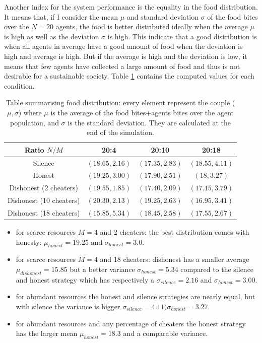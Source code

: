 Another index for the system performance is the equality in the food distribution. 
It means that, if I consider the mean $\mu$ and standard deviation $\sigma$ of 
the food bites over the $N=20$ agents, the food is better distributed ideally when 
the average $\mu$ is high as well as the deviation $\sigma$ is high. 
This indicate that a good distribution is when all agents in average have a good amount of food when the deviation
is high and average is high.
But if the average is high and the deviation is low, it means that few agents have
collected a large amount of food and thus is not desirable for a sustainable society.
Table \ref{tab:foodDistribution} contains the computed values for each condition.

\begin{table}[htbp]
\caption[Social System food distribution]{Table summarising food distribution:
every element represent the couple ($\mu,\sigma$) where $\mu$ is the average of
the food bites+agents bites over the agent population, and $\sigma$ is
the standard deviation. They are calculated at the end of the simulation.
}
\label{tab:foodDistribution}
\begin{center}
\small{
\begin{tabular}{@{}c|ccc@{}}
\hline
Ratio $N/M$ & 20:4 & 20:10 & 20:18\\
\hline
Silence & $(18.65,2.16)$ & $(17.35,2.83)$ & $(18.55,4.11)$\\
\hline
Honest & $(19.25,3.00)$ & $(17.90,2.51)$ & $(18,3.27)$\\
\hline
Dishonest (2 cheaters) & $(19.55,1.85)$  & $(17.40,2.09)$   & $(17.15,3.79)$\\
Dishonest (10 cheaters) & $(20.30,2.13)$  & $(19.25,2.63)$  & $(16.95,3.41)$\\
Dishonest (18 cheaters) & $(15.85,5.34)$ & $(18.45,2.58)$  & $(17.55,2.67)$\\
\end{tabular}
}
\end{center}
\end{table}

\begin{itemize}
\item for scarce resources $M=4$ and 2 cheaters: the best distribution comes 
with honesty:  $\mu_{honest}=19.25$ and $\sigma_{honest}=3.0$.
\item for scarce resources $M=4$ and 18 cheaters: dishonest has a smaller 
average  $\mu_{dishonest}=15.85$ but a better variance $\sigma_{honest}=5.34$ 
compared to the silence and honest strategy which has respectively a $\sigma_{silence}=2.16$ 
and $\sigma_{honest}=3.00$.
\item for abundant resources the honest and silence strategies are nearly equal, 
but with silence the variance is bigger $\sigma_{silence}=4.11)\sigma_{honest}=3.27$.
\item for abundant resources and any percentage of cheaters the honest strategy 
has the larger mean $\mu_{honest}=18.3$ and a comparable variance.
\end{itemize}


